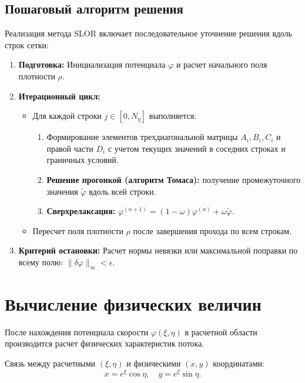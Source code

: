 \documentclass[a4paper,12pt]{article}
\begin{document}
	\subsection{Пошаговый алгоритм решения}
	
	Реализация метода SLOR включает последовательное уточнение решения вдоль строк сетки:
	
	\begin{enumerate}
		\item \textbf{Подготовка:} Инициализация потенциала $\varphi$ и расчет начального поля плотности $\rho$.
		\item \textbf{Итерационный цикл:}
		\begin{itemize}
			\item Для каждой строки $j \in [0, N_\eta]$ выполняется:
			\begin{enumerate}
				\item Формирование элементов трехдиагональной матрицы $A_i, B_i, C_i$ и правой части $D_i$ с учетом текущих значений в соседних строках и граничных условий.
				\item \textbf{Решение прогонкой (алгоритм Томаса):} получение промежуточного значения $\tilde{\varphi}$ вдоль всей строки.
				\item \textbf{Сверхрелаксация:} $\varphi^{(n+1)} = (1 - \omega) \varphi^{(n)} + \omega \tilde{\varphi}$.
			\end{enumerate}
			\item Пересчет поля плотности $\rho$ после завершения прохода по всем строкам.
		\end{itemize}
		\item \textbf{Критерий остановки:} Расчет нормы невязки или максимальной поправки по всему полю: $\|\delta \varphi\|_\infty < \epsilon$.
	\end{enumerate}

	\newpage
	\section{Вычисление физических величин}
	
	После нахождения потенциала скорости $\varphi(\xi, \eta)$ в расчетной области производится расчет физических характеристик потока.
	
	Связь между расчетными $(\xi, \eta)$ и физическими $(x, y)$ координатами:
	\begin{equation}
		x = e^\xi \cos \eta, \quad y = e^\xi \sin \eta.
	\end{equation}
	
\end{document}
